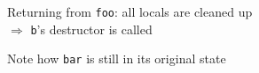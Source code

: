 \begin{frame}
\begin{overprint}
    \begin{center}
      Returning from {\tt foo}: all locals are cleaned up \\
      $\Rightarrow$ {\tt b}'s destructor is called \\
    \end{center}

    \begin{center}
      Note how {\tt bar} is still in its original state
    \end{center}
  \end{overprint}
\end{frame}


